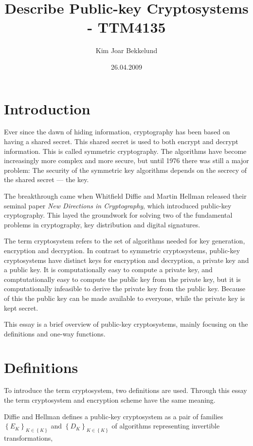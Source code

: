 \documentclass[english,titlepage,11pt]{article}
\begin{document}
\title{Describe Public-key Cryptosystems - TTM4135}
\author{Kim Joar Bekkelund}
\date{26.04.2009}

\maketitle

\section{Introduction}

Ever since the dawn of hiding information, cryptography has been based on having a shared secret. This shared secret is used to both encrypt and decrypt information. This is called symmetric cryptography. The algorithms have become increasingly more complex and more secure, but until 1976 there was still a major problem: The security of the symmetric key algorithms depends on the secrecy of the shared secret --- the key.

The breakthrough came when Whitfield Diffie and Martin Hellman released their seminal paper \emph{New Directions in Cryptography}, which introduced public-key cryptography. This layed the groundwork for solving two of the fundamental problems in cryptography, key distribution and digital signatures.

The term cryptosystem refers to the set of algorithms needed for key generation, encryption and decryption. In contrast to symmetric cryptosystems, public-key cryptosystems have distinct keys for encryption and decryption, a private key and a public key. It is computationally easy to compute a private key, and comptutationally easy to compute the public key from the private key, but it is computationally infeasible to derive the private key from the public key. Because of this the public key can be made available to everyone, while the private key is kept secret.

This essay is a brief overview of public-key cryptosystems, mainly focusing on the definitions and one-way functions.

\section{Definitions}

To introduce the term cryptosystem, two definitions are used. Through this essay the term cryptosystem and encryption scheme have the same meaning.

Diffie and Hellman defines\cite{diffie76} a public-key cryptosystem as a pair of families $\left \{ E_K \right \}_{K\in \left \{ K \right \}}$ and $\left \{ D_K \right \}_{K\in \left \{ K \right \}}$ of algorithms representing invertible transformations,
\end{document}
